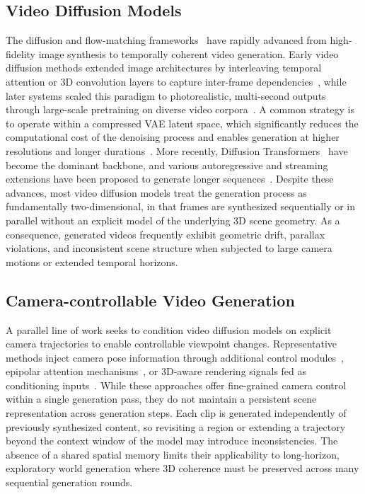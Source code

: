 \documentclass{llmxive}
\begin{document}
\subsection{Video Diffusion Models}
The diffusion and flow-matching frameworks~\cite{lipman2022flow,esser2024scaling} have rapidly advanced from high-fidelity image synthesis to temporally coherent video generation. Early video diffusion methods extended image architectures by interleaving temporal attention or 3D convolution layers to capture inter-frame dependencies~\cite{blattmann2023stable,guo2023animatediff,chen2024videocrafter2}, while later systems scaled this paradigm to photorealistic, multi-second outputs through large-scale pretraining on diverse video corpora~\cite{sora,kong2024hunyuanvideo,yang2024cogvideox,xu2024easyanimate,allegro2024,fan2025vchitect}. A common strategy is to operate within a compressed VAE latent space, which significantly reduces the computational cost of the denoising process and enables generation at higher resolutions and longer durations~\cite{blattmann2023stable,hacohen2024ltx,wan2025wan}. More recently, Diffusion Transformers~\cite{peebles2023scalable} have become the dominant backbone, and various autoregressive and streaming extensions have been proposed to generate longer sequences~\cite{chen2024diffusion,henschel2024streamingt2v,gu2025long,chen2025skyreels,xie2024progressive}. Despite these advances, most video diffusion models treat the generation process as fundamentally two-dimensional, in that frames are synthesized sequentially or in parallel without an explicit model of the underlying 3D scene geometry. As a consequence, generated videos frequently exhibit geometric drift, parallax violations, and inconsistent scene structure when subjected to large camera motions or extended temporal horizons.

\subsection{Camera-controllable Video Generation}
A parallel line of work seeks to condition video diffusion models on explicit camera trajectories to enable controllable viewpoint changes. Representative methods inject camera pose information through additional control modules~\cite{he2024cameractrl,he2025cameractrl,feng2024i2vcontrol,zhang2026panflow}, epipolar attention mechanisms~\cite{yu2024viewcrafter,zhou2025stable}, or 3D-aware rendering signals fed as conditioning inputs~\cite{gu2025das,ren2025gen3c,yang2025omnicam}. While these approaches offer fine-grained camera control within a single generation pass, they do not maintain a persistent scene representation across generation steps. Each clip is generated independently of previously synthesized content, so revisiting a region or extending a trajectory beyond the context window of the model may introduce inconsistencies. The absence of a shared spatial memory limits their applicability to long-horizon, exploratory world generation where 3D coherence must be preserved across many sequential generation rounds.
\end{document}
